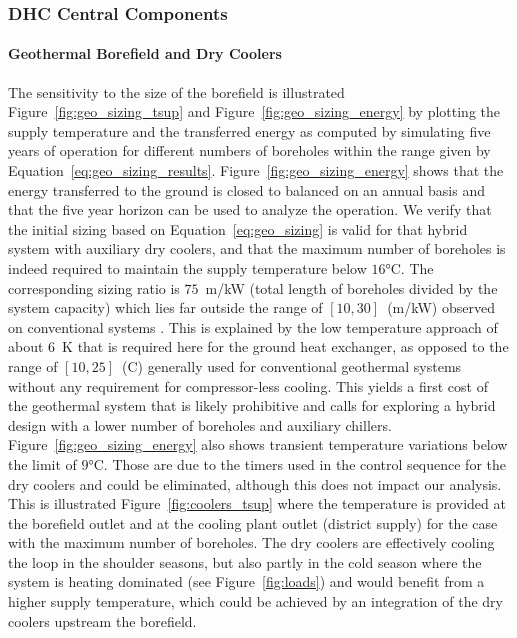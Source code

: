 \subsubsection{DHC Central Components} \label{sec:dhc}

\paragraph{Geothermal Borefield and Dry Coolers}

The sensitivity to the size of the borefield is illustrated Figure~\ref{fig:geo_sizing_tsup} and Figure~\ref{fig:geo_sizing_energy} by plotting the supply temperature and the transferred energy as computed by simulating five years of operation for different numbers of boreholes within the range given by Equation~\ref{eq:geo_sizing_results}.
Figure~\ref{fig:geo_sizing_energy} shows that the energy transferred to the ground is closed to balanced on an annual basis and that the five year horizon can be used to analyze the operation.
We verify that the initial sizing based on Equation~\ref{eq:geo_sizing} is valid for that hybrid system with auxiliary dry coolers, and that the maximum number of boreholes is indeed required to maintain the supply temperature below $16$°C.
The corresponding sizing ratio is $75$~m/kW (total length of boreholes divided by the system capacity) which lies far outside the range of $[10, 30]$~(m/kW) observed on conventional systems \citep{Kavanaugh2014}. This is explained by the low temperature approach of about $6$~K that is required here for the ground heat exchanger, as opposed to the range of $[10, 25]$~(C) generally used for conventional geothermal systems without any requirement for compressor-less cooling.
This yields a first cost of the geothermal system that is likely prohibitive and calls for exploring a hybrid design with a lower number of boreholes and auxiliary chillers.
Figure~\ref{fig:geo_sizing_energy} also shows transient temperature variations below the limit of $9$°C. Those are due to the timers used in the control sequence for the dry coolers and could be eliminated, although this does not impact our analysis. This is illustrated Figure~\ref{fig:coolers_tsup} where the temperature is provided at the borefield outlet and at the cooling plant outlet (district supply) for the case with the maximum number of boreholes. The dry coolers are effectively cooling the loop in the shoulder seasons, but also partly in the cold season where the system is heating dominated (see Figure~\ref{fig:loads}) and would benefit from a higher supply temperature, which could be achieved by an integration of the dry coolers upstream the borefield.


